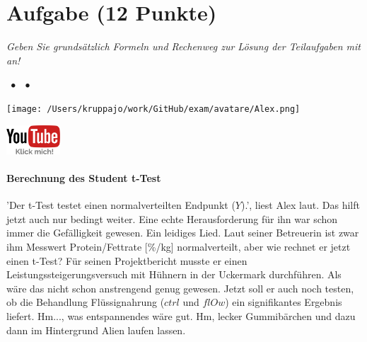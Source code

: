 \documentclass[a4paper, 9pt]{scrartcl}\usepackage[]{graphicx}\usepackage[]{xcolor}
\begin{document}
\section{Aufgabe \hfill (12 Punkte)}

\textit{Geben Sie grundsätzlich Formeln und Rechenweg zur Lösung der Teilaufgaben mit an!} \\[1Ex]
 

 
\ifcollection
\begin{flushright}
\tiny\vspace{-3Ex}
\textbf{\examinhaltstart}
\exammodulemathstat $\;\bullet$
\exammodulestat $\;\bullet$
\exammodulestatbbv 
\vspace{-4Ex}
\end{flushright}
\begin{minipage}[t]{0.5\textwidth}
\texttt{[image: /Users/kruppajo/work/GitHub/exam/avatare/Alex.png]}
\end{minipage}
\begin{minipage}[t]{0.5\textwidth}
\hfill
\href{https://youtu.be/Cq_rF_z4xOk}{\includegraphics[width = 2cm]{img/youtube}}
\end{minipage}
\vspace{-3ex}
\fi



\ifcollection
\paragraph{Berechnung des Student t-Test}
\fi

'Der t-Test testet einen normalverteilten Endpunkt ($Y$).', liest Alex laut. Das hilft jetzt auch nur bedingt weiter. Eine echte Herausforderung für ihn war schon immer die Gefälligkeit gewesen. Ein leidiges Lied. Laut seiner Betreuerin ist zwar ihm Messwert Protein/Fettrate [\%/kg] normalverteilt, aber wie rechnet er jetzt einen t-Test? Für seinen Projektbericht musste er einen Leistungssteigerungsversuch mit Hühnern in der Uckermark durchführen. Als wäre das nicht schon anstrengend genug gewesen. Jetzt soll er auch noch testen, ob die Behandlung Flüssignahrung ($ctrl$ und $flOw$) ein signifikantes Ergebnis liefert. Hm..., was entspannendes wäre gut. Hm, lecker Gummibärchen und dazu dann im Hintergrund Alien laufen lassen.
\end{document}
